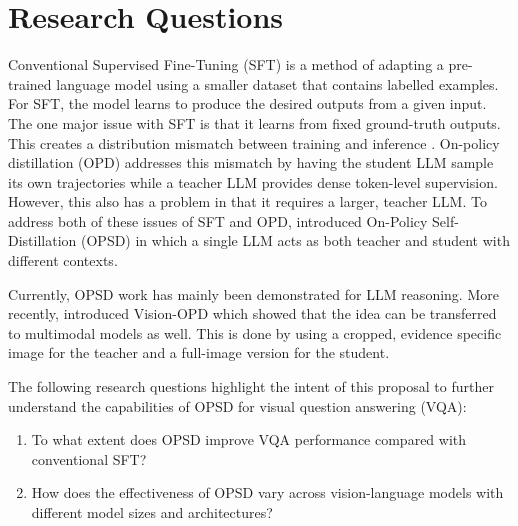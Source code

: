 \section{Research Questions}

Conventional Supervised Fine-Tuning (SFT) is a method of adapting a pre-trained language
model using a smaller dataset that contains labelled examples. For SFT, the model
learns to produce the desired outputs from a given input. The one major issue with
SFT is that it learns from fixed ground-truth outputs. This creates a distribution mismatch between
training and inference \parencite{zhao2601self}. On-policy
distillation (OPD) addresses this mismatch by having the student LLM sample its own trajectories
while a teacher LLM provides dense token-level supervision. However, this also has a problem in that
it requires a larger, teacher LLM. To address both of these issues of SFT and OPD, \textcite{zhao2601self}
introduced On-Policy Self-Distillation (OPSD) in which a single LLM acts as both teacher and student with 
different contexts.

Currently, OPSD work has mainly been demonstrated for LLM reasoning. More recently, 
\textcite{yuan2026vision} introduced Vision-OPD which showed that the idea can be transferred
to multimodal models as well. This is done by using a cropped, evidence specific image
for the teacher and a full-image version for the student. 

The following research questions highlight the intent of this proposal to 
further understand the capabilities of OPSD for visual question answering (VQA):

\begin{enumerate}
    \item To what extent does OPSD improve VQA performance compared with conventional SFT?
    \item How does the effectiveness of OPSD vary across vision-language models with different model sizes and architectures?
\end{enumerate}